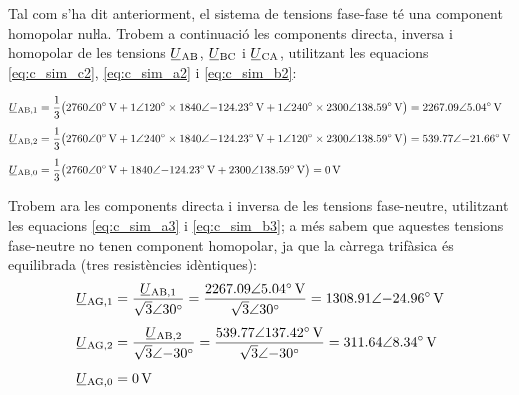 \begin{exemple}
    Tal com s'ha dit anteriorment, el sistema de tensions fase-fase   té una component homopolar nuŀla.     Trobem a continuació les components directa, inversa i homopolar de les
    tensions $\cmplx{U}\ped{AB}$, $\cmplx{U}\ped{BC}$ i
    $\cmplx{U}\ped{CA}$, utilitzant les equacions
    \eqref{eq:c_sim_c2}, \eqref{eq:c_sim_a2} i \eqref{eq:c_sim_b2}:

    \begin{align*}
    \cmplx{U}\ped{AB,1} &= \frac{1}{3} \big(
    \complexqty{2760:0}{V} + \complexnum{1:120} \times \complexqty{1840:-124,23}{V} +
    \complexnum{1:240} \times \complexqty{2300:138,59}{V}\big) = \complexqty{2267,09:5,04}{V} \\[1ex]
    \cmplx{U}\ped{AB,2} &= \frac{1}{3} \big(
    \complexqty{2760:0}{V} + \complexnum{1:240} \times \complexqty{1840:-124,23}{V} +
    \complexnum{1:120} \times \complexqty{2300:138,59}{V} \big) = \complexqty{539,77:-21,66}{V} \\[1ex]
    \cmplx{U}\ped{AB,0} &= \frac{1}{3} \big(
    \complexqty{2760:0}{V} + \complexqty{1840:-124,23}{V} + \complexqty{2300:138,59}{V}\big) = \qty{0}{V}
    \end{align*}

    Trobem ara les components directa i inversa
    de les tensions fase-neutre, utilitzant les equacions
    \eqref{eq:c_sim_a3} i \eqref{eq:c_sim_b3}; a més sabem que aquestes tensions fase-neutre no
    tenen component homopolar, ja que la càrrega trifàsica és equilibrada
    (tres resistències idèntiques):
    \begin{align*}
        \cmplx{U}\ped{AG,1} &=
        \frac{\cmplx{U}\ped{AB,1}}{\complexnum[parse-numbers=false]{\sqrt{3}:30}} =
        \frac{\complexqty{2267,09:5,04}{V}}{\sqrt{3}\angle\ang{30}} =
        \complexqty{1308,91:-24,96}{V} \\[1ex]
        \cmplx{U}\ped{AG,2} &=
        \frac{\cmplx{U}\ped{AB,2}}{\sqrt{3}\angle{\ang{-30}}} =
        \frac{\complexqty{539,77:137,42}{V}}{\complexnum[parse-numbers=false]{\sqrt{3}:-30}} =
        \complexqty{311,64:8,34}{V} \\[1ex]
        \cmplx{U}\ped{AG,0} &= \qty{0}{V}
    \end{align*}



\end{exemple}
